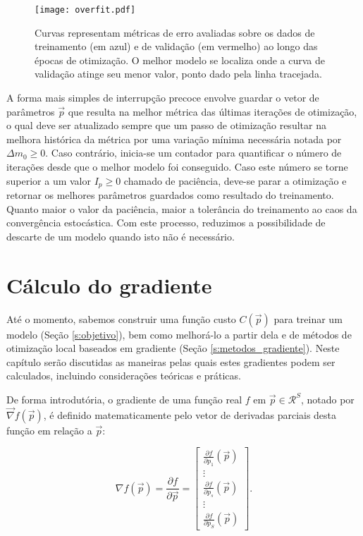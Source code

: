     \begin{figure}
      \begin{center}
        \texttt{[image: overfit.pdf]}
      \end{center}
      \caption{Curvas representam métricas de erro avaliadas sobre os dados de treinamento (em azul) e de validação (em vermelho) ao longo das épocas de otimização. O melhor modelo se localiza onde a curva de validação atinge seu menor valor, ponto dado pela linha tracejada.}
      \label{f:overfit}
    \end{figure}

    A forma mais simples de interrupção precoce envolve guardar o vetor de parâmetros $\vec{p}$ que resulta na melhor métrica das últimas iterações de otimização, o qual deve ser atualizado sempre que um passo de otimização resultar na melhora histórica da métrica por uma variação mínima necessária notada por $\Delta m_0 \geq 0$. Caso contrário, inicia-se um contador para quantificar o número de iterações desde que o melhor modelo foi conseguido. Caso este número se torne superior a um valor $I_p \geq 0$ chamado de paciência, deve-se parar a otimização e retornar os melhores parâmetros guardados como resultado do treinamento. Quanto maior o valor da paciência, maior a tolerância do treinamento ao caos da convergência estocástica. Com este processo, reduzimos a possibilidade de descarte de um modelo quando isto não é necessário.


\chapter{Cálculo do gradiente} \label{c:gradiente_calculo}

  Até o momento, sabemos construir uma função custo $C(\vec{p})$ para treinar um modelo (Seção \ref{s:objetivo}), bem como melhorá-lo a partir dela e de métodos de otimização local baseados em gradiente (Seção \ref{s:metodos_gradiente}). Neste capítulo serão discutidas as maneiras pelas quais estes gradientes podem ser calculados, incluindo considerações teóricas e práticas.

  De forma introdutória, o gradiente de uma função real $f$ em $\vec{p} \in \mathcal{R}^S$, notado por $\vec{\nabla} f(\vec{p})$, é definido matematicamente pelo vetor de derivadas parciais desta função em relação a $\vec{p}$:

  \begin{equation} \label{e:gradiente_definicao}
    \nabla f(\vec{p}) =
    \dfrac{\partial f}{\partial \vec{p}} =
    \begin{bmatrix}
      \frac{\partial f}{\partial p_1}(\vec{p}) \\
      \vdots \\
      \frac{\partial f}{\partial p_s}(\vec{p}) \\
      \vdots \\
      \frac{\partial f}{\partial p_S}(\vec{p})
    \end{bmatrix}
    .
  \end{equation}

